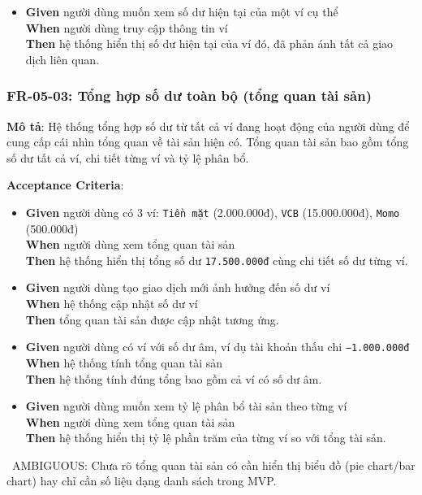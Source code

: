 \begin{itemize}
\item \textbf{Given} người dùng muốn xem số dư hiện tại của một ví cụ thể  \\ \hspace*{1.5em}  \textbf{When} người dùng truy cập thông tin ví  \\ \hspace*{1.5em}  \textbf{Then} hệ thống hiển thị số dư hiện tại của ví đó, đã phản ánh tất cả giao dịch liên quan.
\end{itemize}
\subsubsection{FR-05-03: Tổng hợp số dư toàn bộ (tổng quan tài sản)}

\textbf{Mô tả}: Hệ thống tổng hợp số dư từ tất cả ví đang hoạt động của người dùng để cung cấp cái nhìn tổng quan về tài sản hiện có. Tổng quan tài sản bao gồm tổng số dư tất cả ví, chi tiết từng ví và tỷ lệ phân bổ.



\textbf{Acceptance Criteria}:

\begin{itemize}
\item \textbf{Given} người dùng có 3 ví: \texttt{Tiền mặt} (2.000.000đ), \texttt{VCB} (15.000.000đ), \texttt{Momo} (500.000đ)  \\ \hspace*{1.5em}  \textbf{When} người dùng xem tổng quan tài sản  \\ \hspace*{1.5em}  \textbf{Then} hệ thống hiển thị tổng số dư \texttt{17.500.000đ} cùng chi tiết số dư từng ví.
\item \textbf{Given} người dùng tạo giao dịch mới ảnh hưởng đến số dư ví  \\ \hspace*{1.5em}  \textbf{When} hệ thống cập nhật số dư ví  \\ \hspace*{1.5em}  \textbf{Then} tổng quan tài sản được cập nhật tương ứng.
\item \textbf{Given} người dùng có ví với số dư âm, ví dụ tài khoản thấu chi \texttt{−1.000.000đ}  \\ \hspace*{1.5em}  \textbf{When} hệ thống tính tổng quan tài sản  \\ \hspace*{1.5em}  \textbf{Then} hệ thống tính đúng tổng bao gồm cả ví có số dư âm.
\item \textbf{Given} người dùng muốn xem tỷ lệ phân bổ tài sản theo từng ví  \\ \hspace*{1.5em}  \textbf{When} người dùng xem tổng quan tài sản  \\ \hspace*{1.5em}  \textbf{Then} hệ thống hiển thị tỷ lệ phần trăm của từng ví so với tổng tài sản.
\end{itemize}
\warningicon\  AMBIGUOUS: Chưa rõ tổng quan tài sản có cần hiển thị biểu đồ (pie chart/bar chart) hay chỉ cần số liệu dạng danh sách trong MVP.



